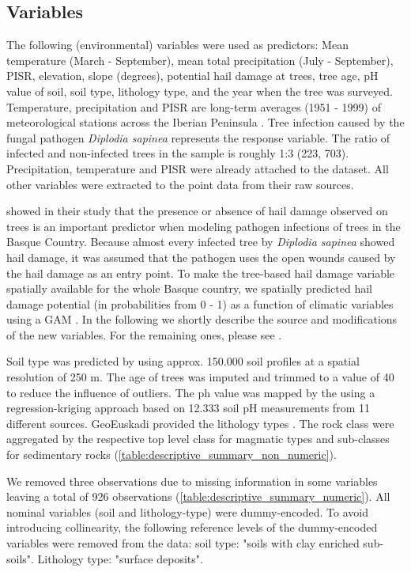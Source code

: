 \documentclass[review]{elsarticle}
\begin{document}
\subsection{Variables}

The following (environmental) variables were used as predictors: Mean temperature (March - September), mean total precipitation (July - September), \ac{PISR}, elevation, slope (degrees), potential hail damage at trees, tree age, pH value of soil, soil type, lithology type, and the year when the tree was surveyed.
Temperature, precipitation and \ac{PISR} are long-term averages (1951 - 1999) of meteorological stations across the Iberian Peninsula \citep{Ninyerola2005}.
Tree infection caused by the fungal pathogen \textit{Diplodia sapinea} represents the response variable.
The ratio of infected and non-infected trees in the sample is roughly 1:3 (223, 703).
Precipitation, temperature and PISR were already attached to the dataset.
All other variables were extracted to the point data from their raw sources.

\cite{Iturritxa2014} showed in their study that the presence or absence of hail damage observed on trees is an important predictor when modeling pathogen infections of trees in the Basque Country.
Because almost every infected tree by \textit{Diplodia sapinea} showed hail damage, it was assumed that the pathogen uses the open wounds caused by the hail damage as an entry point.
To make the tree-based hail damage variable spatially available for the whole Basque country, we spatially predicted hail damage potential (in probabilities from 0 - 1) as a function of climatic variables using a \ac{GAM} \citep{Schratz2016}.
In the following we shortly describe the source and modifications of the new variables.
For the remaining ones, please see \cite{Iturritxa2014}.

Soil type was predicted by \cite{Hengl2017} using approx. 150.000 soil profiles at a spatial resolution of 250 m.
The age of trees was imputed and trimmed to a value of 40 to reduce the influence of outliers.
The ph value was mapped by the \cite{ph} using a regression-kriging approach based on 12.333 soil pH measurements from 11 different sources.
GeoEuskadi provided the lithology types \citep{lithology}.
The rock class were aggregated by the respective top level class for magmatic types and sub-classes for sedimentary rocks \citep{Grotzinger2016} (\autoref{table:descriptive_summary_non_numeric}).

We removed three observations due to missing information in some variables leaving a total of 926 observations (\autoref{table:descriptive_summary_numeric}).
All nominal variables (soil and lithology-type) were dummy-encoded.
To avoid introducing collinearity, the following reference levels of the dummy-encoded variables were removed from the data: soil type: "soils with clay enriched sub-soils". Lithology type: "surface deposits".
\end{document}
